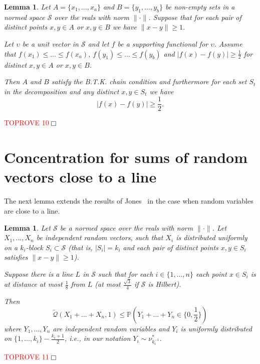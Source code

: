 \documentclass{article}
\newenvironment{proof}{\noindent{\bf Proof}}{\hspace*{\fill}$\Box$}
\newtheorem{lemma} [theorem] {Lemma}\newtheorem{attempt} [theorem] {Attempt}\newtheorem{corollary} [theorem] {Corollary}\newtheorem{prop} [theorem] {Proposition}\newtheorem{definition} [theorem] {Definition}\newtheorem{remark} [theorem] {Remark}\newtheorem{conjecture} [theorem] {Conjecture}\newtheorem{claim} [theorem] {Claim}
\newcommand{\pr}{\mathbb P}
\newcommand{\concdiam}{\tilde{\mathcal{Q}}}
\newcommand\nuopt[1]{\nu_{#1}^*}
\begin{document}
\begin{lemma}\label{lem.btk_strip2}
    Let $A=\{x_1, \dots, x_a\}$ and $B=\{y_1, \dots, y_b\}$ be non-empty sets in a normed space $\mathcal{S}$ over the reals with norm $\|\cdot\|$.
    Suppose that for each pair of distinct points $x,y \in A$
    or $x,y \in B$ we have $\|x - y\| \ge 1$. 


    Let $\upsilon$ be a unit vector in $\mathcal{S}$ and let $f$ be a supporting functional for $\upsilon$.
    Assume that $f(x_1) \le \dots \le f(x_a)$, $f(y_1) \le \dots \le f(y_b)$ and $|f(x) - f(y)| \ge \frac 1 2$ for distinct $x,y \in A$  or $x,y \in B$.
   
    Then $A$ and $B$ satisfy the B.T.K. chain condition and furthermore
    for each set $S_t$ in the decomposition and any distinct $x,y \in S_t$
    we have 
    \begin{equation}\label{eq.supporting_separation}
        |f(x) - f(y)| \ge \frac 1 2.
    \end{equation}
\end{lemma}


\begin{proof}\textcolor{red}{TOPROVE 10}\end{proof}


\section{Concentration for sums of random vectors close to a line}
\label{sec.nice_proofs}

The next lemma extends the results of Jones~\cite{jones} in the case when random variables
are close to a line.

\begin{lemma}\label{lem.jones_strip}
    Let $\mathcal{S}$ be a normed space over the reals with norm  $\|\cdot\|$.
Let $X_1, \dots, X_n$ be independent random vectors,
    such that $X_i$ is distributed uniformly on a $k_i$-block $S_i \subset \mathcal{S}$ (that is, $|S_i| = k_i$ and each pair of distinct points $x,y \in S_i$ satisfies $\|x - y \| \ge 1$).

    Suppose there is a line $L$ in $\mathcal{S}$ such that for each $i \in \{1,\dots,n\}$ each
    point $x \in S_i$ is at distance at most $\frac 1 8$ from $L$ (at most $\frac{\sqrt 3} 4$ if $\mathcal{S}$ is Hilbert).

    Then
    \[
        \concdiam(X_1 + \dots + X_n, 1) \le \pr(Y_1 + \dots + Y_n \in \{0, \frac 1 2\})
    \]
    where $Y_1, \dots, Y_n$ are independent random variables and $Y_i$ is uniformly distributed on $\{1, \dots, k_i\} - \frac{k_i+1} 2$, i.e., in our notation $Y_i \sim \nuopt {k_i^{-1}}$.
\end{lemma}
\begin{proof}\textcolor{red}{TOPROVE 11}\end{proof}
\end{document}
